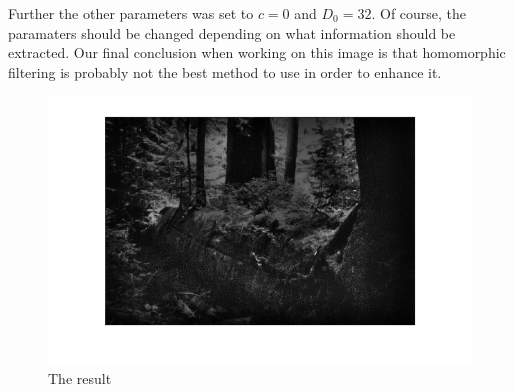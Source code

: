 		Further the other parameters was set to $c = 0$ and $D_0 = 32$. Of course,
		the paramaters should be changed depending on what information should be extracted.
		Our final conclusion when working on this image is that homomorphic filtering
		is probably not the best method to use in order to enhance it.
		\begin{figure}[h!]
			\includegraphics{pics/resulting_image.png}
			\caption{The result}
			\label{fig:result}		
		\end{figure}
							    
